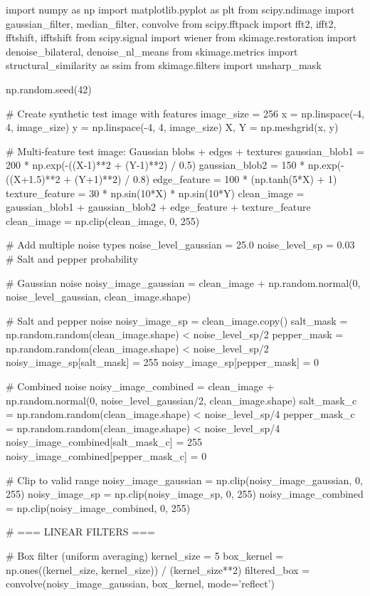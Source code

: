 \documentclass[a4paper, 11pt]{article}
\begin{document}
\begin{pycode}
import numpy as np
import matplotlib.pyplot as plt
from scipy.ndimage import gaussian_filter, median_filter, convolve
from scipy.fftpack import fft2, ifft2, fftshift, ifftshift
from scipy.signal import wiener
from skimage.restoration import denoise_bilateral, denoise_nl_means
from skimage.metrics import structural_similarity as ssim
from skimage.filters import unsharp_mask

np.random.seed(42)

# Create synthetic test image with features
image_size = 256
x = np.linspace(-4, 4, image_size)
y = np.linspace(-4, 4, image_size)
X, Y = np.meshgrid(x, y)

# Multi-feature test image: Gaussian blobs + edges + textures
gaussian_blob1 = 200 * np.exp(-((X-1)**2 + (Y-1)**2) / 0.5)
gaussian_blob2 = 150 * np.exp(-((X+1.5)**2 + (Y+1)**2) / 0.8)
edge_feature = 100 * (np.tanh(5*X) + 1)
texture_feature = 30 * np.sin(10*X) * np.sin(10*Y)
clean_image = gaussian_blob1 + gaussian_blob2 + edge_feature + texture_feature
clean_image = np.clip(clean_image, 0, 255)

# Add multiple noise types
noise_level_gaussian = 25.0
noise_level_sp = 0.03  # Salt and pepper probability

# Gaussian noise
noisy_image_gaussian = clean_image + np.random.normal(0, noise_level_gaussian, clean_image.shape)

# Salt and pepper noise
noisy_image_sp = clean_image.copy()
salt_mask = np.random.random(clean_image.shape) < noise_level_sp/2
pepper_mask = np.random.random(clean_image.shape) < noise_level_sp/2
noisy_image_sp[salt_mask] = 255
noisy_image_sp[pepper_mask] = 0

# Combined noise
noisy_image_combined = clean_image + np.random.normal(0, noise_level_gaussian/2, clean_image.shape)
salt_mask_c = np.random.random(clean_image.shape) < noise_level_sp/4
pepper_mask_c = np.random.random(clean_image.shape) < noise_level_sp/4
noisy_image_combined[salt_mask_c] = 255
noisy_image_combined[pepper_mask_c] = 0

# Clip to valid range
noisy_image_gaussian = np.clip(noisy_image_gaussian, 0, 255)
noisy_image_sp = np.clip(noisy_image_sp, 0, 255)
noisy_image_combined = np.clip(noisy_image_combined, 0, 255)

# === LINEAR FILTERS ===

# Box filter (uniform averaging)
kernel_size = 5
box_kernel = np.ones((kernel_size, kernel_size)) / (kernel_size**2)
filtered_box = convolve(noisy_image_gaussian, box_kernel, mode='reflect')


\end{pycode}
\end{document}
